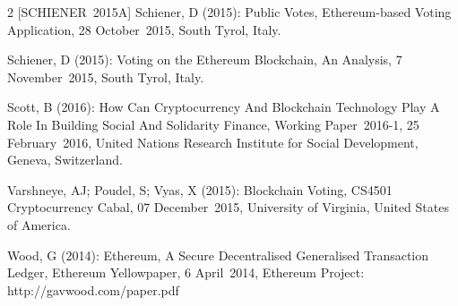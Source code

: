 \documentclass[9pt,oneside]{amsart}
\begin{document}
\begin{multicols}{2}
[SCHIENER~2015A] Schiener, D (2015): Public Votes, Ethereum-based Voting Application, 28 October~2015, South Tyrol, Italy.\par
[SCHIENER~2015B] Schiener, D (2015): Voting on the Ethereum Blockchain, An Analysis, 7 November~2015, South Tyrol, Italy.\par
[SCOTT~2016] Scott, B (2016): How Can Cryptocurrency And Blockchain Technology Play A Role In Building Social And Solidarity Finance, Working Paper~2016-1, 25 February~2016, United Nations Research Institute for Social Development, Geneva, Switzerland.\par
[VARSHNEYA~et~al.~2015] Varshneye, AJ; Poudel, S; Vyas, X (2015): Blockchain Voting, CS4501 Cryptocurrency Cabal, 07 December~2015, University of Virginia, United States of America.\par
[WOOD~2014] Wood, G (2014): Ethereum, A Secure Decentralised Generalised Transaction Ledger, Ethereum Yellowpaper, 6 April~2014, Ethereum Project: http://gavwood.com/paper.pdf


\end{multicols}
\end{document}
